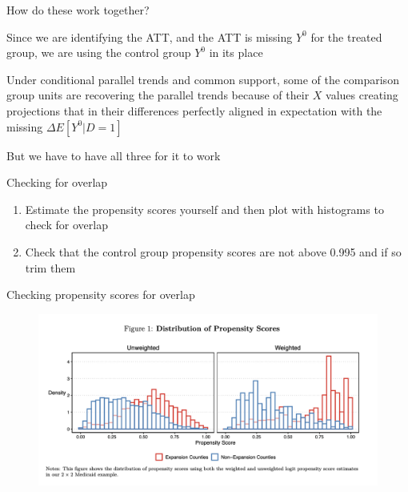 \documentclass{beamer}
\begin{document}
\begin{frame}{How do these work together?}

Since we are identifying the ATT, and the ATT is missing $Y^0$ for the treated group, we are using the control group $Y^0$ in its place

\bigskip

Under conditional parallel trends and common support, some of the comparison group units are recovering the parallel trends because of their $X$ values creating projections that in their differences perfectly aligned in expectation with the missing $\Delta E[Y^0|D=1]$

\bigskip

But we have to have all three for it to work

\end{frame}

\begin{frame}{Checking for overlap}

\begin{enumerate}
\item Estimate the propensity scores yourself and then plot with histograms to check for overlap
\item Check that the control group propensity scores are not above 0.995 and if so trim them
\end{enumerate}

\end{frame}

\begin{frame}{Checking propensity scores for overlap}

	\begin{figure}
	\includegraphics[scale=0.05]{./lecture_includes/baker_pscore.png}
	\end{figure}

\end{frame}
\end{document}
